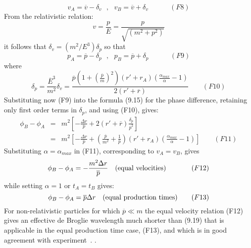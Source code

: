 {    \[ v_A = \overline{v}-\delta_v~~~,~~~  v_B = \overline{v}+\delta_v~~~~~~~~~~~~~~(F8) \]
    From the relativistic relation:
   \[ v = \frac{p}{E} = \frac{p}{\sqrt{(m^2+p^2)}} \]
   it follows that $\delta_v = (m^2/E^3) \delta_p$ so that
     \[ p_A = \overline{p}-\delta_p~~~,~~~  p_B = \overline{p}+\delta_p~~~~~~~~~~~~~~(F9) \]
     where
    \[ \delta_p = \frac{\overline{E}^3}{m^2} \delta_v = \frac{ \overline{p}(1+(\frac{\overline{p}}{m})^2)(r'+r_A)
  (\frac{\alpha_{max}}{\alpha}-1)}{2(r'+\overline{r})} ~~~~~~~~~(F10) \]
   Substituting now (F9) into the formula (9.15) for the phase difference, retaining only 
   first order terms in $\delta_p$, and using (F10), gives:
     \begin{eqnarray} 
     \phi_B - \phi_A & = & m^2 \left[ -\frac{\Delta r}{\overline{p}}
     +2(r'+\overline{r})\frac{\delta_p}{\overline{p}^2}\right] \nonumber \\
 & = & m^2 \left[ -\frac{\Delta r}{\overline{p}}+\left(\frac{\overline{p}}{m^2}+\frac{1}{\overline{p}}\right)
      (r'+r_A)(\frac{\alpha_{max}}{\alpha}-1) \right]  \nonumber~~~~~~~~~(F11) 
   \end{eqnarray}
    Substituting $\alpha = \alpha_{max}$ in (F11), corresponding to $v_A = v_B$, gives
   \[  \phi_B - \phi_A  = -\frac{ m^2 \Delta r}{\overline{p}}~~~({\rm equal~velocities})~~~~~~~~~~~(F12) \]
  while setting $\alpha = 1$ or $ t_A =  t_B$ gives:
  \[  \phi_B - \phi_A  = \overline{p} \Delta r~~~({\rm equal~production~times})~~~~~~(F13) \]
    For non-relativistic particles for which $\overline{p} \ll m$ the equal velocity relation (F12)
    gives an effective de Broglie wavelength much shorter than (9.19) that is applicable in the
    equal production time case, (F13), and which is in good agreement with experiment~\cite{DG}.
. 

 

}
